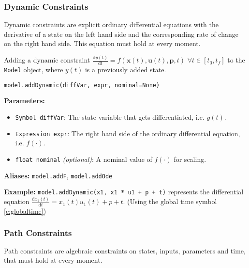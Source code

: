\documentclass[12pt]{article}
\newcommand{\dd}{\mathrm{d}}
\renewcommand{\v}{\bm}
\begin{document}
\subsubsection{Dynamic Constraints}

Dynamic constraints are explicit ordinary differential equations with
the derivative of a state on the left hand side and the corresponding rate of
change on the right hand side. This equation must hold at every moment.

\begin{mdframed}[backgroundcolor=gray!10, roundcorner=10pt,
		linewidth=1pt]

	Adding a dynamic constraint $\frac{\dd y(t)}{\dd t} =
		f(\v{x}(t), \v{u}(t), \v{p}, t) \,\, \forall t \in [t_0, t_f]$
	to
	the \texttt{Model}
	object, where $y(t)$ is a previously added state.

	\begin{lstlisting}
model.addDynamic(diffVar, expr, nominal=None)
		\end{lstlisting}
	\label{addDynamic}
	\textbf{Parameters:}
	\begin{itemize}
		\item \texttt{Symbol diffVar}: The state variable that
		      gets differentiated, i.e. $y(t)$.
		\item \texttt{Expression expr}: The right hand side of
		      the ordinary differential equation, i.e. $f(\cdot)$.
		\item \texttt{float nominal} \emph{(optional)}: A
		      nominal value of $f(\cdot)$ for scaling.
	\end{itemize}

	\textbf{Aliases:}  \texttt{model.addF}, \texttt{model.addOde}

	\textbf{Example:} \texttt{model.addDynamic(x1, x1 * u1 + p +
		t)} represents the differential equation
	$\frac{\dd x_1(t)}{\dd t} = x_1(t) u_1(t) + p + t$. (Using the
	global time symbol \eqref{c:globaltime})
\end{mdframed}

\subsubsection{Path Constraints}

Path constraints are algebraic constraints on states, inputs,
parameters and time, that must hold at every moment.
\end{document}

